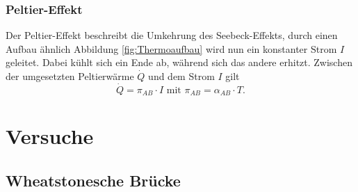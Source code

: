 \subsubsection{Peltier-Effekt}
Der Peltier-Effekt beschreibt die Umkehrung des Seebeck-Effekts, durch einen Aufbau ähnlich Abbildung \ref{fig:Thermoaufbau} wird nun ein konstanter Strom $I$ geleitet. Dabei kühlt sich ein Ende ab, während sich das andere erhitzt. Zwischen der umgesetzten Peltierwärme $\dot Q$ und dem Strom $I$ gilt
\begin{equation}
\dot Q = \pi_{AB}\cdot I \text{ mit } \pi_{AB}=\alpha_{AB}\cdot T.
\end{equation}
\section{Versuche}
\subsection{Wheatstonesche Brücke}

